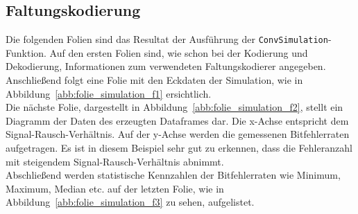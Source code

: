 \subsection{Faltungskodierung}
\label{kapitel:visualisierung_simulation_faltungskodierung}
Die folgenden Folien sind das Resultat der Ausführung der \texttt{ConvSimulation}-Funktion. Auf den ersten Folien sind, wie schon bei der Kodierung und Dekodierung, Informationen zum verwendeten Faltungskodierer angegeben.
\\
Anschließend folgt eine Folie mit den Eckdaten der Simulation, wie in Abbildung~\ref{abb:folie_simulation_f1} ersichtlich.
\\
Die nächste Folie, dargestellt in Abbildung~\ref{abb:folie_simulation_f2}, stellt ein Diagramm der Daten des erzeugten Dataframes dar. Die x-Achse entspricht dem Signal-Rausch-Verhältnis. Auf der y-Achse werden die gemessenen Bitfehlerraten aufgetragen. Es ist in diesem Beispiel sehr gut zu erkennen, dass die Fehleranzahl mit steigendem Signal-Rausch-Verhältnis abnimmt.
\\
Abschließend werden statistische Kennzahlen der Bitfehlerraten wie Minimum, Maximum, Median etc. auf der letzten Folie, wie in Abbildung~\ref{abb:folie_simulation_f3} zu sehen, aufgelistet. 

